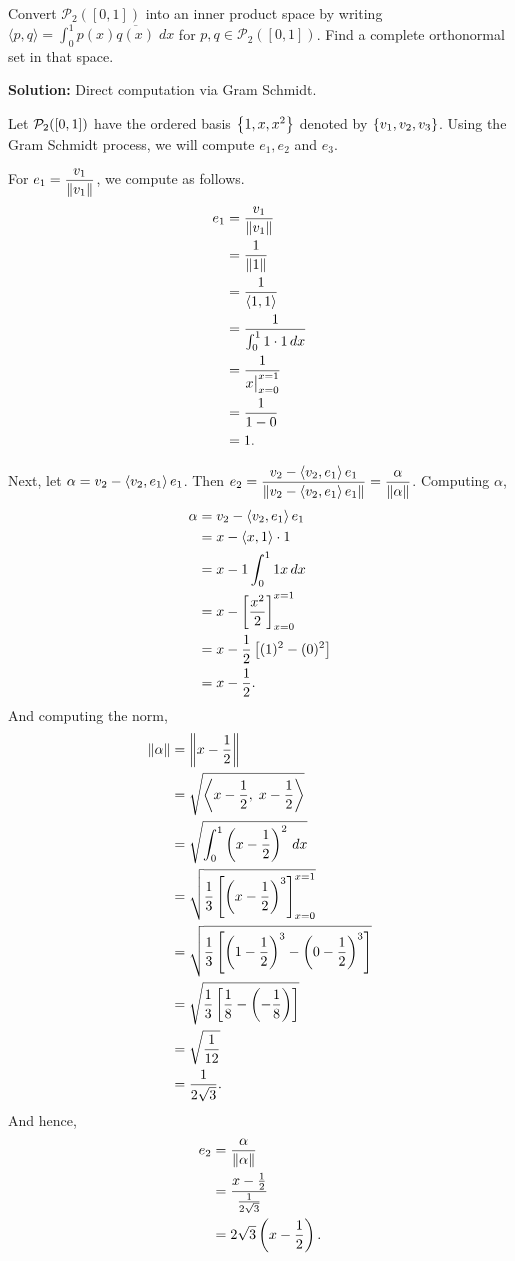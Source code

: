 Convert $\mathcal{P}_2([0,1])$ into an inner product space by writing $\langle p,q \rangle = \int_0^1 p(x)\overline{q(x)} \; dx$ for $p,q \in \mathcal{P}_2([0,1])$. Find a complete orthonormal set in that space.

\nnl \textbf{Solution:} Direct computation via Gram Schmidt.

    \nl Let $\mathcal{P}_{2}({[0,1]})$ have the ordered basis $\left\{{1,x,x^2}\right\}$ denoted by $\left\{{v_1,v_2,v_3}\right\}$. Using the Gram Schmidt process, we will compute $e_1, e_2$ and $e_3$.

    \nnl For $e_1 = \dfrac{v_1}{\left\| {v_1} \right\|}$, we compute as follows.
    \begin{align*}
        e_1 &= \frac{v_1}{\left\| {v_1} \right\|}\\ &= \frac{1}{\left\| {1} \right\|}\\
        &= \frac{1}{{\left\langle{1,1}\right\rangle}}\\
        &= \frac{1}{{\int_0^1 1 \cdot 1 \, dx}}\\
        &= \frac{1}{{ x\big|_{x=0}^{x=1}}}\\
        &= \frac{1}{{1-0}}\\
        &= 1.
    \end{align*}
    
    \newpage Next, let $\alpha = v_2-\left\langle{v_2,e_1}\right\rangle e_1$. Then $e_2 = \dfrac{v_2-\left\langle{v_2,e_1}\right\rangle e_1}{\left\| {v_2-\left\langle{v_2,e_1}\right\rangle e_1} \right\|} = \dfrac{\alpha}{\left\| {\alpha} \right\|}$. Computing $\alpha$,
    \begin{align*}
        \alpha &= v_2-\left\langle{v_2,e_1}\right\rangle e_1\\
            &= x-\left\langle{x,1}\right\rangle\cdot 1 \\
            &= x - 1 \int_0^1 1x \,dx\\
            &= x - \left[ {\frac{x^2}{2}} \right]_{x=0}^{x=1}\\
            &= x - \frac{1}{{2}}\left[ {(1)^2 - (0)^2} \right]\\
            &= x - \frac{1}{{2}}.
    \end{align*}
    And computing the norm,
    \begin{align*}
        \left\| {\alpha} \right\| &= \left\| {x - \frac{1}{{2}}} \right\|\\
            &= \sqrt{\left\langle{x - \frac{1}{{2}}, \; x - \frac{1}{{2}}}\right\rangle}\\
            &= \sqrt{\int_0^1 \left( {x - \frac{1}{{2}}} \right)^2\,dx}\\
            &= \sqrt{\frac{1}{{3}}\left[ {\left( {x - \frac{1}{{2}}} \right)^3} \right]_{x=0}^{x=1}}\\
            &= \sqrt{\frac{1}{{3}}\left[ {\left( {1 - \frac{1}{{2}}} \right)^3 - \left( {0 - \frac{1}{{2}}} \right)^3} \right]}\\
            &= \sqrt{\frac{1}{{3}}\left[ {\frac{1}{{8}} - \left( {- \frac{1}{{8}}} \right)} \right]}\\
            &= \sqrt{\frac{1}{{12}}}\\
            &= \frac{1}{{2\sqrt{3}}}.
    \end{align*}
    And hence,
    \begin{align*}
        e_2 &= \frac{\alpha}{\left\| {\alpha} \right\|}\\
        &= \frac{x - \frac{1}{{2}}}{\frac{1}{{2\sqrt{3}}}}\\
        &= 2\sqrt{3}\left( {x - \frac{1}{{2}}} \right).
    \end{align*}
    
